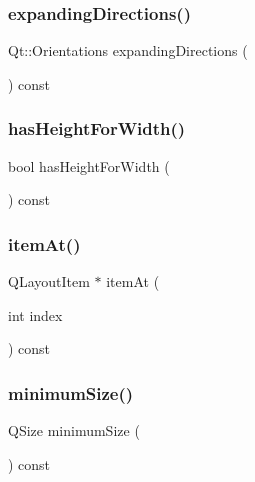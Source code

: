 \subsubsection{\texorpdfstring{expanding\+Directions()}{expandingDirections()}}
{\footnotesize\ttfamily Qt\+::\+Orientations expanding\+Directions (\begin{DoxyParamCaption}{ }\end{DoxyParamCaption}) const}

\mbox{\label{classGBorderLayout_a2a0610d5e39948800e89572cb972d712}} 
\subsubsection{\texorpdfstring{has\+Height\+For\+Width()}{hasHeightForWidth()}}
{\footnotesize\ttfamily bool has\+Height\+For\+Width (\begin{DoxyParamCaption}{ }\end{DoxyParamCaption}) const}

\mbox{\label{classGBorderLayout_a1c4494f3e99dfeb9ee9de910781a18f7}} 
\subsubsection{\texorpdfstring{item\+At()}{itemAt()}}
{\footnotesize\ttfamily Q\+Layout\+Item $\ast$ item\+At (\begin{DoxyParamCaption}\item[{int}]{index }\end{DoxyParamCaption}) const}

\mbox{\label{classGBorderLayout_a186810cbd3b80e47e72d510e05a3d512}} 
\subsubsection{\texorpdfstring{minimum\+Size()}{minimumSize()}}
{\footnotesize\ttfamily Q\+Size minimum\+Size (\begin{DoxyParamCaption}{ }\end{DoxyParamCaption}) const}

